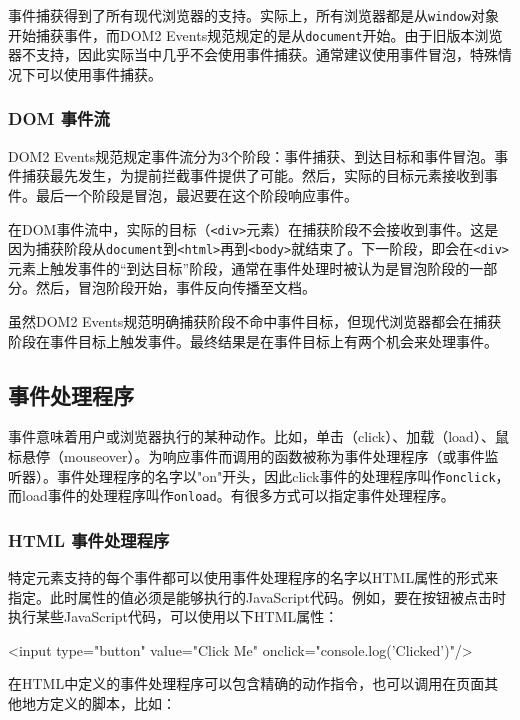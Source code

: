 事件捕获得到了所有现代浏览器的支持。实际上，所有浏览器都是从\texttt{window}对象开始捕获事件，而DOM2 Events规范规定的是从\texttt{document}开始。由于旧版本浏览器不支持，因此实际当中几乎不会使用事件捕获。通常建议使用事件冒泡，特殊情况下可以使用事件捕获。

\subsubsection*{DOM 事件流}

DOM2 Events规范规定事件流分为3个阶段：事件捕获、到达目标和事件冒泡。事件捕获最先发生，为提前拦截事件提供了可能。然后，实际的目标元素接收到事件。最后一个阶段是冒泡，最迟要在这个阶段响应事件。

在DOM事件流中，实际的目标（\texttt{<div>}元素）在捕获阶段不会接收到事件。这是因为捕获阶段从\texttt{document}到\texttt{<html>}再到\texttt{<body>}就结束了。下一阶段，即会在\texttt{<div>}元素上触发事件的“到达目标”阶段，通常在事件处理时被认为是冒泡阶段的一部分。然后，冒泡阶段开始，事件反向传播至文档。

虽然DOM2 Events规范明确捕获阶段不命中事件目标，但现代浏览器都会在捕获阶段在事件目标上触发事件。最终结果是在事件目标上有两个机会来处理事件。

\subsection{事件处理程序}

事件意味着用户或浏览器执行的某种动作。比如，单击（click）、加载（load）、鼠标悬停（mouseover）。为响应事件而调用的函数被称为事件处理程序（或事件监听器）。事件处理程序的名字以"on"开头，因此click事件的处理程序叫作\texttt{onclick}，而load事件的处理程序叫作\texttt{onload}。有很多方式可以指定事件处理程序。

\subsubsection*{HTML 事件处理程序}

特定元素支持的每个事件都可以使用事件处理程序的名字以HTML属性的形式来指定。此时属性的值必须是能够执行的JavaScript代码。例如，要在按钮被点击时执行某些JavaScript代码，可以使用以下HTML属性：

\begin{JavaScript}
<input type="button" value="Click Me" onclick="console.log('Clicked')"/> 
\end{JavaScript}

在HTML中定义的事件处理程序可以包含精确的动作指令，也可以调用在页面其他地方定义的脚本，比如：

